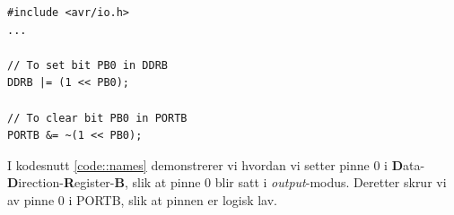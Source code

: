\documentclass[11pt,a4paper]{article}
\begin{document}
\begin{lstlisting}[caption=Bruk av registernavn.,label=code::names]
#include <avr/io.h>
...

// To set bit PB0 in DDRB
DDRB |= (1 << PB0);

// To clear bit PB0 in PORTB
PORTB &= ~(1 << PB0);
\end{lstlisting}
I kodesnutt \ref{code::names} demonstrerer vi hvordan vi setter pinne 0 i \textbf{D}ata-\textbf{D}irection-\textbf{R}egister-\textbf{B}, slik at pinne 0 blir satt i \textit{output}-modus. Deretter skrur vi av pinne 0 i PORTB, slik at pinnen er logisk lav.
\end{document}
